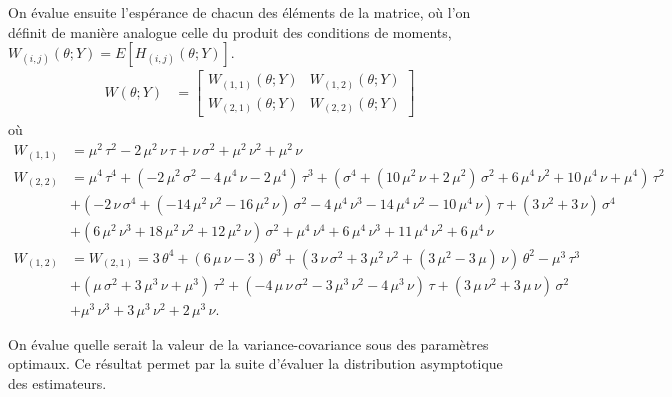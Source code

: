 On évalue ensuite l'espérance de chacun des éléments de la matrice, où
l'on définit de manière analogue celle du produit des conditions de
moments, $W_{(i,j)}(\theta;Y) = E[H_{(i,j)}(\theta;Y)]$.
\begin{align}
  W(\theta;Y) &= \left[\begin{array}{cc}
      W_{(1,1)}(\theta;Y) & W_{(1,2)}(\theta;Y) \\
      W_{(2,1)}(\theta;Y) & W_{(2,2)}(\theta;Y)
    \end{array} \right]
\end{align}
où
\begin{align*}
  W_{(1,1)} &= {\mu}^{2}\,{\tau}^{2}-2\,{\mu}^{2}\,\nu\,\tau+\nu\,{\sigma}^{2}+{\mu}^{2}\,{\nu}^{2}+{\mu}^{2}\,\nu \\
  W_{(2,2)} &= {\mu}^{4}\,{\tau}^{4}+\left( -2\,{\mu}^{2}\,{\sigma}^{2}-4\,{\mu}^{4}\,\nu-2\,{\mu}^{4}\right) \,{\tau}^{3}+\left( {\sigma}^{4}+\left( 10\,{\mu}^{2}\,\nu+2\,{\mu}^{2}\right) \,{\sigma}^{2}+6\,{\mu}^{4}\,{\nu}^{2}+10\,{\mu}^{4}\,\nu+{\mu}^{4}\right) \,{\tau}^{2}\\
  &+\left( -2\,\nu\,{\sigma}^{4}+ \left( -14\,{\mu}^{2}\,{\nu}^{2}-16\,{\mu}^{2}\,\nu\right) \,{\sigma}^{2}-4\,{\mu}^{4}\,{\nu}^{3}-14\,{\mu}^{4}\,{\nu}^{2}-10\,{\mu}^{4}\,\nu\right) \,\tau+\left( 3\,{\nu}^{2}+3\,\nu\right) \,{\sigma}^{4}\\
  &+\left( 6\,{\mu}^{2}\,{\nu}^{3}+18\,{\mu}^{2}\,{\nu}^{2}+12\,{\mu}^{2}\,\nu\right) \,{\sigma}^{2}+{\mu}^{4}\,{\nu}^{4}+6\,{\mu}^{4}\,{\nu}^{3}+11\,{\mu}^{4}\,{\nu}^{2}+6\,{\mu}^{4}\,\nu \\
  W_{(1,2)} &= W_{(2,1)} = 3\,{\theta}^{4}+\left( 6\,\mu\,\nu-3\right) \,{\theta}^{3}+\left( 3\,\nu\,{\sigma}^{2}+3\,{\mu}^{2}\,{\nu}^{2}+\left( 3\,{\mu}^{2}-3\,\mu\right) \,\nu\right) \,{\theta}^{2}-{\mu}^{3}\,{\tau}^{3} \\
  &+\left( \mu\,{\sigma}^{2}+3\,{\mu}^{3}\,\nu+{\mu}^{3}\right) \,{\tau}^{2}+\left( -4\,\mu\,\nu\,{\sigma}^{2}-3\,{\mu}^{3}\,{\nu}^{2}-4\,{\mu}^{3}\,\nu\right) \,\tau+\left( 3\,\mu\,{\nu}^{2}+3\,\mu\,\nu\right) \,{\sigma}^{2}\\
  &+{\mu}^{3}\,{\nu}^{3}+3\,{\mu}^{3}\,{\nu}^{2}+2\,{\mu}^{3}\,\nu.
\end{align*}

On évalue quelle serait la valeur de la variance-covariance sous des
paramètres optimaux. Ce résultat permet par la suite d'évaluer la
distribution asymptotique des estimateurs.

